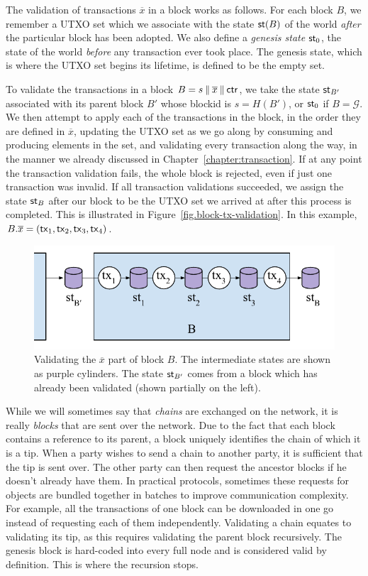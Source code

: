 The validation of transactions
$\overline{x}$ in a block works as follows. For each block $B$, we remember a UTXO set which we
associate with the state $\mathsf{st}(B)$ of the world \emph{after} the particular block has been adopted.
We also define a \emph{genesis state} $\mathsf{st}_0$, the state of the world \emph{before}
any transaction ever
took place. The genesis state, which is where the UTXO set begins its lifetime, is defined to be the
empty set.

To validate the transactions in a block $B = s \mathbin{\|} \overline{x} \mathbin{\|} \mathsf{ctr}$, we take the state
$\mathsf{st}_{B'}$ associated with
its parent block $B'$ whose blockid is $s = H(B')$, or $\mathsf{st}_0$ if $B = \mathcal{G}$.
We then attempt to apply each of the transactions in the block, in the order
they are defined in $\overline{x}$, updating the UTXO set as we go along by consuming
and producing elements in the set, and validating
every transaction along the way, in the manner we already discussed in Chapter~\ref{chapter:transaction}.
If at any point the transaction validation fails, the whole block is rejected,
even if just one transaction was invalid. If all transaction validations succeeded,
we assign the state $\mathsf{st}_B$ after our block to be the UTXO set we arrived at after
this process is completed. This is illustrated in Figure~\ref{fig.block-tx-validation}.
In this example, $B.\overline{x} = (\mathsf{tx}_1, \mathsf{tx}_2, \mathsf{tx}_3, \mathsf{tx}_4)$.

\begin{figure}[h]
    \centering
    \includegraphics[width=0.7 \columnwidth,keepaspectratio]{figures/block-tx-validation.pdf}
    \caption{Validating the $\overline{x}$ part of block $B$. The intermediate states
             are shown as purple cylinders. The state $\mathsf{st}_{B'}$ comes from a block
             which has already been validated (shown partially on the left).}
    \label{fig.fee}
\end{figure}

While we will sometimes say that \emph{chains} are exchanged on the network, it is really
\emph{blocks} that are sent over the network. Due to the fact that each block contains
a reference to its parent, a block uniquely identifies the chain of which it is a tip.
When a party wishes to send a chain to another party, it is sufficient that the tip is
sent over. The other party can then request the ancestor blocks if he doesn't already
have them.
In practical protocols, sometimes these requests for objects are bundled
together in batches to improve communication complexity. For example, all the transactions
of one block can be downloaded in one go instead of requesting each of them independently.
Validating a chain equates to validating its tip, as this requires validating
the parent block recursively. The genesis block is hard-coded into every full node and is
considered valid by definition. This is where the recursion stops.

